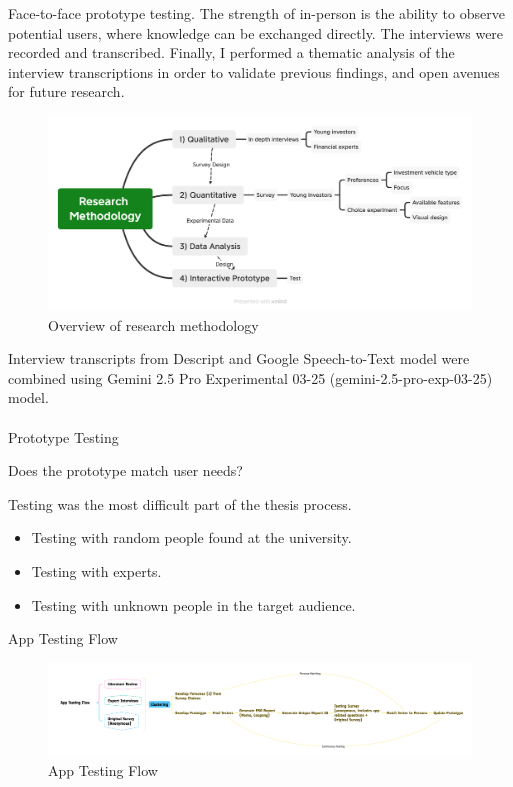\documentclass[
  12pt,
  letterpaper,
  DIV=11,
  numbers=noendperiod]{scrartcl}
\makeatletter
\let\oldparagraph\paragraph
\renewcommand{\paragraph}{
    \@ifstar
      \xxxParagraphStar
      \xxxParagraphNoStar
  }
\newcommand{\xxxParagraphStar}[1]{\oldparagraph*{#1}\mbox{}}
\newcommand{\xxxParagraphNoStar}[1]{\oldparagraph{#1}\mbox{}}
\makeatother
\begin{document}
Face-to-face prototype testing. The strength of in-person is the ability
to observe potential users, where knowledge can be exchanged directly.
The interviews were recorded and transcribed. Finally, I performed a
thematic analysis of the interview transcriptions in order to validate
previous findings, and open avenues for future research.

\begin{figure}[H]

{\centering \includegraphics[width=1\linewidth,height=\textheight,keepaspectratio]{./images/methodology/research-methodology.png}

}

\caption{Overview of research methodology}

\end{figure}%

Interview transcripts from Descript and Google Speech-to-Text model were
combined using Gemini 2.5 Pro Experimental 03-25
(gemini-2.5-pro-exp-03-25) model.

\paragraph{Prototype Testing}\label{prototype-testing}

Does the prototype match user needs?

Testing was the most difficult part of the thesis process.

\begin{itemize}
\item
  Testing with random people found at the university.
\item
  Testing with experts.
\item
  Testing with unknown people in the target audience.
\end{itemize}

App Testing Flow

\begin{figure}[H]

{\centering \includegraphics[width=1\linewidth,height=\textheight,keepaspectratio]{./images/testing/app-testing-flow.png}

}

\caption{App Testing Flow}

\end{figure}%
\end{document}

